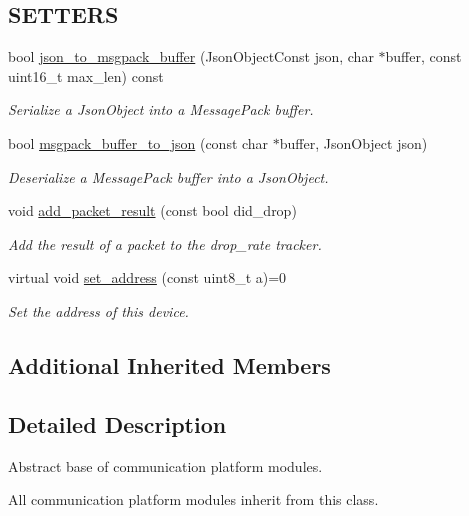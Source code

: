 \subsection*{S\+E\+T\+T\+E\+RS}
\begin{DoxyCompactItemize}
\item 
bool \hyperlink{class_loom_comm_plat_af5030b99e3398396af535558efa82279}{json\+\_\+to\+\_\+msgpack\+\_\+buffer} (Json\+Object\+Const json, char $\ast$buffer, const uint16\+\_\+t max\+\_\+len) const 
\begin{DoxyCompactList}\small\item\em Serialize a Json\+Object into a Message\+Pack buffer. \end{DoxyCompactList}\item 
bool \hyperlink{class_loom_comm_plat_ae6b8468f5345cf30d857e3229d3f5aa3}{msgpack\+\_\+buffer\+\_\+to\+\_\+json} (const char $\ast$buffer, Json\+Object json)
\begin{DoxyCompactList}\small\item\em Deserialize a Message\+Pack buffer into a Json\+Object. \end{DoxyCompactList}\item 
void \hyperlink{class_loom_comm_plat_a7053c8475d0f2c00507fe0806f1d37bc}{add\+\_\+packet\+\_\+result} (const bool did\+\_\+drop)
\begin{DoxyCompactList}\small\item\em Add the result of a packet to the drop\+\_\+rate tracker. \end{DoxyCompactList}\item 
virtual void \hyperlink{class_loom_comm_plat_afa0f66b4e657effefc34fa5a74363174}{set\+\_\+address} (const uint8\+\_\+t a)=0
\begin{DoxyCompactList}\small\item\em Set the address of this device. \end{DoxyCompactList}\end{DoxyCompactItemize}
\subsection*{Additional Inherited Members}


\subsection{Detailed Description}
Abstract base of communication platform modules. 

All communication platform modules inherit from this class.

